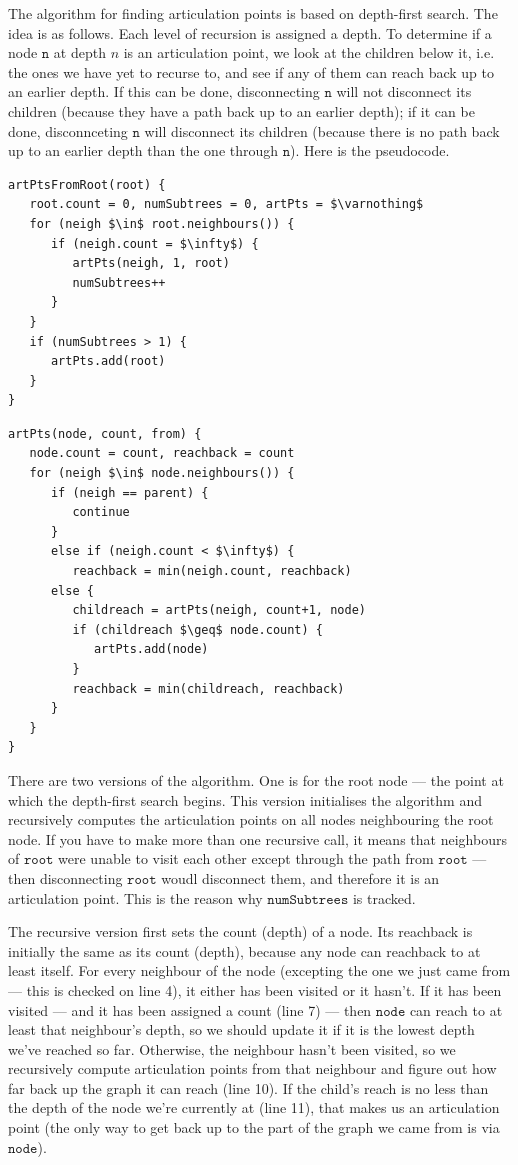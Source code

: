 \documentclass[a4paper,12pt]{article}
\newcommand{\kwa}[1]{\mathtt{#1}}
\begin{document}
\noindent
The algorithm for finding articulation points is based on depth-first search. The idea is as follows. Each level of recursion is assigned a depth. To determine if a node $\kwa{n}$ at depth $n$ is an articulation point, we look at the children below it, i.e. the ones we have yet to recurse to, and see if any of them can reach back up to an earlier depth. If this can be done, disconnecting $\kwa{n}$ will not disconnect its children (because they have a path back up to an earlier depth); if it can be done, disconnceting $\kwa{n}$ will disconnect its children (because there is no path back up to an earlier depth than the one through $\kwa{n}$). Here is the pseudocode.

\begin{lstlisting}
artPtsFromRoot(root) {
   root.count = 0, numSubtrees = 0, artPts = $\varnothing$
   for (neigh $\in$ root.neighbours()) {
      if (neigh.count = $\infty$) {
         artPts(neigh, 1, root)
         numSubtrees++
      }
   }
   if (numSubtrees > 1) {
      artPts.add(root)
   }
}
\end{lstlisting}

\begin{lstlisting}
artPts(node, count, from) {
   node.count = count, reachback = count
   for (neigh $\in$ node.neighbours()) {
      if (neigh == parent) {
         continue
      }
      else if (neigh.count < $\infty$) {
         reachback = min(neigh.count, reachback)
      else {
         childreach = artPts(neigh, count+1, node)
         if (childreach $\geq$ node.count) {
            artPts.add(node)
         }
         reachback = min(childreach, reachback)
      }
   }
}
\end{lstlisting}

There are two versions of the algorithm. One is for the root node --- the point at which the depth-first search begins. This version initialises the algorithm and recursively computes the articulation points on all nodes neighbouring the root node. If you have to make more than one recursive call, it means that neighbours of $\kwa{root}$ were unable to visit each other except through the path from $\kwa{root}$ --- then disconnecting $\kwa{root}$ woudl disconnect them, and therefore it is an articulation point. This is the reason why $\kwa{numSubtrees}$ is tracked.

The recursive version first sets the count (depth) of a node. Its reachback is initially the same as its count (depth), because any node can reachback to at least itself. For every neighbour of the node (excepting the one we just came from --- this is checked on line 4), it either has been visited or it hasn't. If it has been visited --- and it has been assigned a count (line 7) --- then $\kwa{node}$ can reach to at least that neighbour's depth, so we should update it if it is the lowest depth we've reached so far. Otherwise, the neighbour hasn't been visited, so we recursively compute articulation points from that neighbour and figure out how far back up the graph it can reach (line 10). If the child's reach is no less than the depth of the node we're currently at (line 11), that makes us an articulation point (the only way to get back up to the part of the graph we came from is via $\kwa{node}$). 
\end{document}
